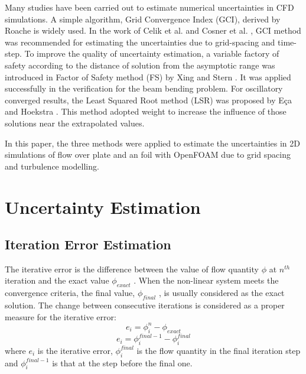 \documentclass{cfdsc}
\begin{document}
\begin{multicols}{2}
Many studies have been carried out to estimate numerical uncertainties in CFD simulations. A simple algorithm, Grid Convergence Index (GCI), derived by Roache \cite{ref1} is widely used. In the work of Celik et al. \cite{ref2} and Cosner et al. \cite{ref3}, GCI method was recommended for estimating the uncertainties due to grid-spacing and time-step. To improve the quality of uncertainty estimation, a variable factory of safety according to the distance of solution from the asymptotic range was introduced in Factor of Safety method (FS) by Xing and Stern \cite{ref4}. It was applied successfully in the verification for the beam bending problem. For oscillatory converged results, the Least Squared Root method (LSR) was proposed by E{\c{c}}a and Hoekstra \cite{ref5}. This method adopted weight to increase the influence of those solutions near the extrapolated values.

In this paper, the three methods were applied to estimate the uncertainties in 2D simulations of flow over plate and an foil with OpenFOAM due to grid spacing and turbulence modelling. 


\section{Uncertainty Estimation}

\subsection{Iteration Error Estimation}
The iterative error is the difference between the value of flow quantity $ \phi $ at $ n^{th} $ iteration  and the exact value $ \phi_{exact} $ . When the non-linear system meets the convergence criteria, the final value, $ \phi_{final} $ , is usually considered as the exact solution.  The change between consecutive iterations is considered as a proper measure for the iterative error:
\begin{equation}\label{eq_1}
e_i=\phi_i^{n}-\phi_{exact}
\end{equation}
\begin{equation}\label{eq_2}
e_i=\phi_i^{final-1}-\phi_i^{final}
\end{equation}
where $e_i$  is the iterative error, $\phi_i^{final}$  is the flow quantity in the final iteration step and $\phi_i^{final-1}$ is that at the step before the final one.


\end{multicols}
\end{document}
